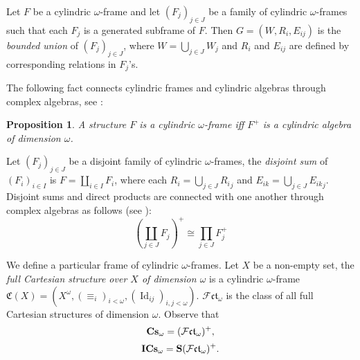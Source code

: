 \documentclass{article}
\theoremstyle{defin}
\theoremstyle{theorem}
\theoremstyle{claim}
\theoremstyle{prop}
\newtheorem{prop}{Proposition}
\theoremstyle{lemma}
\theoremstyle{fact}
\theoremstyle{remark}
\theoremstyle{ex}
\theoremstyle{col}
\theoremstyle{question}
\begin{document}
Let $F$ be a cylindric $\omega$-frame and let $(F_j)_{j \in J}$ be a family of cylindric $\omega$-frames such that each $F_j$ is a generated subframe of $F$. Then $G = (W, R_i, E_{ij})$ is the \emph{bounded union} of $(F_j)_{j \in J}$, where $W = \bigcup \limits_{j \in J} W_j$ and $R_i$ and $E_{ij}$ are defined by corresponding relations in $F_j$'s.

The following fact connects cylindric frames and cylindric algebras through complex algebras, see \cite[Proposition 2.1.5]{Venema2013}:
\begin{prop} \label{framealgebra}
A structure $F$ is a cylindric $\omega$-frame iff $F^{+}$ is a cylindric algebra of dimension $\omega$.
\end{prop}

Let $(F_j)_{j \in J}$ be a disjoint family of cylindric $\omega$-frames, the \emph{disjoint sum} of $(F_i)_{i \in I}$ is $F = \coprod \limits_{i \in I} F_i$, where each $R_i = \bigcup \limits_{j \in J} {R_i}_j$ and $E_{ik} = \bigcup \limits_{j \in J} {E_{ik}}_j$. Disjoint sums and direct products are connected with one another through complex algebras as follows (see \cite[Lemma 3.4.1]{goldblatt1989varieties}):
\begin{equation} \label{prod}
(\coprod \limits_{j \in J} F_j)^{+} \cong \prod \limits_{j \in J} F_j^{+}
\end{equation}


\vspace{\baselineskip}

We define a particular frame of cylindric $\omega$-frames. Let $X$ be a non-empty set, the \emph{full Cartesian structure over $X$ of dimension $\omega$} is a cylindric $\omega$-frame $\mathfrak{C}(X) = (X^{\omega}, (\equiv_i)_{i < \omega}, (\operatorname{Id}_{ij})_{i, j < \omega})$. $\mathcal{F}\mathfrak{ct}_{\omega}$ is the class of all full Cartesian structures of dimension $\omega$. Observe that
\begin{equation} \label{cmcubes}
{\bf Cs}_{\omega} = (\mathcal{F}\mathfrak{ct}_{\omega})^{+},
\end{equation}
\begin{equation} \label{isocmcubes}
{\bf I Cs}_{\omega} = {\bf S}(\mathcal{F}\mathfrak{ct}_{\omega})^{+}.
\end{equation}
\end{document}
